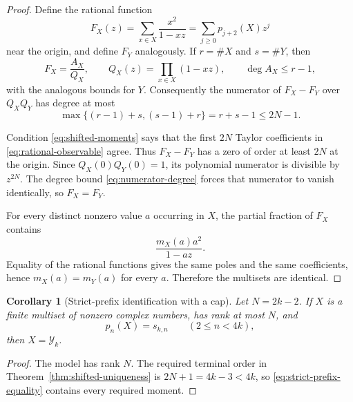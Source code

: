 \documentclass[11pt]{article}
\newtheorem{corollary}[theorem]{Corollary}
\theoremstyle{remark}
\newcommand{\cY}{\mathcal Y}
\begin{document}
\begin{proof}
Define the rational function
\begin{equation}\label{eq:rational-observable}
 F_X(z)=\sum_{x\in X}\frac{x^2}{1-xz}
       =\sum_{j\ge0}p_{j+2}(X)z^j
\end{equation}
near the origin, and define $F_Y$ analogously.  If $r=\#X$ and $s=\#Y$,
then
\begin{equation}\label{eq:rational-degree}
 F_X=\frac{A_X}{Q_X},\qquad
 Q_X(z)=\prod_{x\in X}(1-xz),\qquad
 \deg A_X\le r-1,
\end{equation}
with the analogous bounds for $Y$.  Consequently the numerator of
$F_X-F_Y$ over $Q_XQ_Y$ has degree at most
\begin{equation}\label{eq:numerator-degree}
 \max\{(r-1)+s,(s-1)+r\}=r+s-1\le2N-1.
\end{equation}

Condition \eqref{eq:shifted-moments} says that the first $2N$ Taylor
coefficients in \eqref{eq:rational-observable} agree.  Thus $F_X-F_Y$ has a
zero of order at least $2N$ at the origin.  Since $Q_X(0)Q_Y(0)=1$, its
polynomial numerator is divisible by $z^{2N}$.  The degree bound
\eqref{eq:numerator-degree} forces that numerator to vanish identically, so
$F_X=F_Y$.

For every distinct nonzero value $a$ occurring in $X$, the partial fraction
of $F_X$ contains
\begin{equation}\label{eq:multiplicity-term}
 \frac{m_X(a)a^2}{1-az}.
\end{equation}
Equality of the rational functions gives the same poles and the same
coefficients, hence $m_X(a)=m_Y(a)$ for every $a$.  Therefore the multisets
are identical.
\end{proof}

\begin{corollary}[Strict-prefix identification with a cap]
\label{cor:strict-prefix}
Let $N=2k-2$.  If $X$ is a finite multiset of nonzero complex numbers, has
rank at most $N$, and
\begin{equation}\label{eq:strict-prefix-equality}
 p_n(X)=s_{k,n}\qquad(2\le n<4k),
\end{equation}
then $X=\cY_k$.
\end{corollary}

\begin{proof}
The model has rank $N$.  The required terminal order in
Theorem~\ref{thm:shifted-uniqueness} is
$2N+1=4k-3<4k$, so \eqref{eq:strict-prefix-equality} contains every required
moment.
\end{proof}
\end{document}
